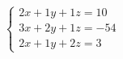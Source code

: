 \documentclass[preview]{standalone}
\begin{document}
\begin{align*}
\begin{cases} 2x + 1y + 1z = 10 \\ 3x + 2y + 1z = -54 \\ 2x + 1y + 2z = 3 \end{cases}
\end{align*}
\end{document}

